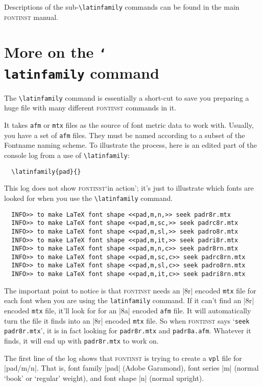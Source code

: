 \documentclass[a4paper]{ltxguide}
\newcommand*{\cs}[1]{\texttt{\char`\\ #1}\xspace}
\newcommand*{\setfilename}[1]{\texttt{#1}}
\newcommand*{\setpackagename}[1]{\textsc{#1}}
\newcommand{\fontinst}{\setpackagename{font\-inst}\xspace}
\newcommand{\Fontnamekb}{Fontname\xspace}
\newcommand{\afm}{\setfilename{afm}\xspace}
\newcommand{\vpl}{\setfilename{vpl}\xspace}
\newcommand{\mtx}{\setfilename{mtx}\xspace}
\begin{document}
\begin{bfseries}
  Descriptions of the sub-\verb|\latinfamily| commands can be found 
  in the main \fontinst manual.
\end{bfseries}



\section{More on the \cs{latinfamily} command}

The \verb|\latinfamily| command is essentially a short-cut to save you
preparing a huge file with many different \fontinst commands in it.

It takes \afm or \mtx files as the source of font metric data to work
with.  Usually, you have a set of \afm files.  They must be named
according to a subset of the \Fontnamekb naming scheme.  To illustrate
the process, here is an edited part of the console log from a use of
\verb|\latinfamily|:
\begin{verbatim}
  \latinfamily{pad}{}
\end{verbatim}
This log does not show \fontinst `in action'; it's just to illustrate
which fonts are looked for when you use the \verb|\latinfamily|
command.
\begin{verbatim}
  INFO>> to make LaTeX font shape <<pad,m,n,>> seek padr8r.mtx
  INFO>> to make LaTeX font shape <<pad,m,sc,>> seek padrc8r.mtx
  INFO>> to make LaTeX font shape <<pad,m,sl,>> seek padro8r.mtx
  INFO>> to make LaTeX font shape <<pad,m,it,>> seek padri8r.mtx
  INFO>> to make LaTeX font shape <<pad,m,n,c>> seek padr8rn.mtx
  INFO>> to make LaTeX font shape <<pad,m,sc,c>> seek padrc8rn.mtx
  INFO>> to make LaTeX font shape <<pad,m,sl,c>> seek padro8rn.mtx
  INFO>> to make LaTeX font shape <<pad,m,it,c>> seek padri8rn.mtx
\end{verbatim}

The important point to notice is that \fontinst needs an |8r| encoded
\mtx file for each font when you are using the \verb|latinfamily|
command.  If it can't find an |8r| encoded \mtx file, it'll look for
for an |8a| encoded \afm file.  It will automatically turn the file it
finds into an |8r| encoded \mtx file.  So when \fontinst says
`\verb|seek padr8r.mtx|', it is in fact looking for
\texttt{padr8r.mtx} and \texttt{padr8a.afm}.  Whatever it finds, it
will end up with \verb|padr8r.mtx| to work on.

The first line of the log shows that \fontinst is trying to create a
\vpl file for |pad/m/n|.  That is, font family |pad| (Adobe Garamond),
font series |m| (normal `book' or `regular' weight), and font shape
|n| (normal upright).
\end{document}
